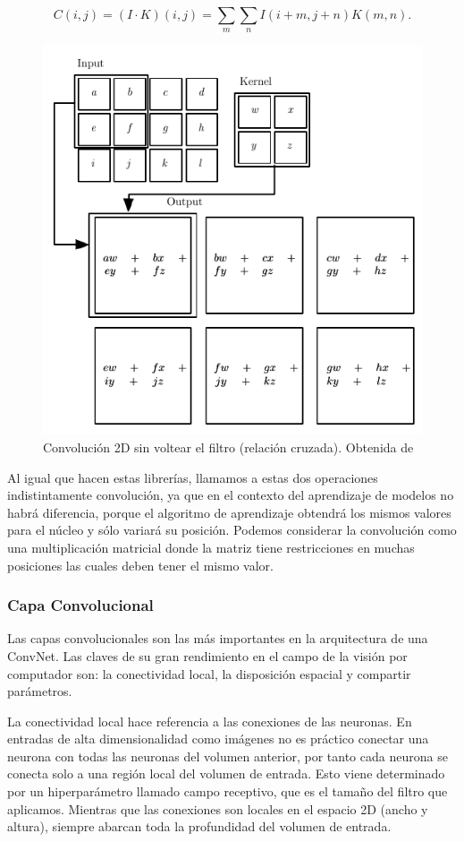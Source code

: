 $$C(i,j)= (I \cdot K)(i,j) = \sum_m \sum_n I(i+m,j+n)K(m,n).$$


\begin{figure}
    \centering
    \includegraphics[width=0.5\linewidth]{Plantilla_TFG_latex//imagenes//Inf//2.Fund/Conv.png}
    \caption{Convolución 2D sin voltear el filtro (relación cruzada). Obtenida de \cite{GoodFellowBook}}
    \label{fig:3.Conv}
\end{figure}


Al igual que hacen estas librerías, llamamos a estas dos operaciones indistintamente convolución, ya que en el contexto del aprendizaje de modelos no habrá diferencia, porque el algoritmo de aprendizaje obtendrá los mismos valores para el núcleo y sólo variará su posición. Podemos considerar la convolución como una multiplicación matricial donde la matriz tiene restricciones en muchas posiciones las cuales deben tener el mismo valor.

\subsubsection{Capa Convolucional}


Las capas convolucionales son las más importantes en la arquitectura de una ConvNet. Las claves de su gran rendimiento en el campo de la visión por computador son: la conectividad local, la disposición espacial y compartir parámetros.

La conectividad local hace referencia a las conexiones de las neuronas. En entradas de alta dimensionalidad como imágenes no es práctico conectar una neurona con todas las neuronas del volumen anterior, por tanto cada neurona se conecta solo a una región local del volumen de entrada. Esto viene determinado por un hiperparámetro llamado campo receptivo, que es el tamaño del filtro que aplicamos. Mientras que las conexiones son locales en el espacio 2D (ancho y altura), siempre abarcan toda la profundidad del volumen de entrada.

